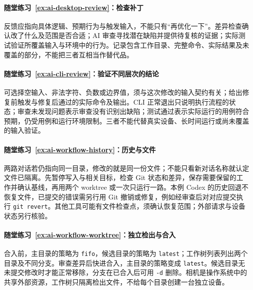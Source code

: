 \paragraph*{随堂练习~\ref{ex:ai-desktop-review}：检查补丁}
\begin{solution}
反馈应指向具体逻辑、预期行为与触发输入，不能只有“再优化一下”。差异检查确认改了什么及范围是否合适；AI 审查寻找潜在缺陷并提供待复核的证据；实际测试验证所覆盖输入与环境中的行为。记录包含工作目录、完整命令、实际结果及未覆盖的部分，不能把三者互相当作替代品。
\end{solution}

\paragraph*{随堂练习~\ref{ex:ai-cli-review}：验证不同层次的结论}
\begin{solution}
可选择空输入、非法字符、负数或边界值，须与这次修改的输入契约有关；给出修复前触发与修复后通过的实际命令及输出。CLI 正常退出只说明执行流程的状态；审查未发现问题表示审查没有识别出缺陷；测试通过表示实际运行的用例符合预期，仍受用例和运行环境限制。三者不能代替真实设备、长时间运行或尚未覆盖的输入验证。
\end{solution}

\paragraph*{随堂练习~\ref{ex:ai-workflow-history}：历史与文件}
\begin{solution}
两路对话若仍指向同一目录，修改的就是同一份文件；不能只看新对话名称就认定文件已隔离。先暂停写入与相关目标，检查 Git 状态和差异，保存需要保留的工作并确认基线，再用两个 worktree 或一次只运行一路。本例 Codex 的历史回退不恢复文件，已提交的错误需另行用 Git 撤销或修复，例如经审查后对对应提交执行 \texttt{git revert}。其他工具可能有文件检查点，须确认恢复范围；外部请求与设备状态另行核验。
\end{solution}

\paragraph*{随堂练习~\ref{ex:ai-workflow-worktree}：独立检出与合入}
\begin{solution}
合入前，主目录的策略为 \texttt{fifo}，候选目录的策略为 \texttt{latest}；工作树列表列出两个目录及不同分支。审查差异后快进合入，主目录的策略变成 \texttt{latest}。候选目录无未提交修改时才能正常移除，分支在已合入后可用 \texttt{-d} 删除。相机是操作系统中的共享外部资源，工作树只隔离检出文件，不给每个目录创建一台独立设备。
\end{solution}

